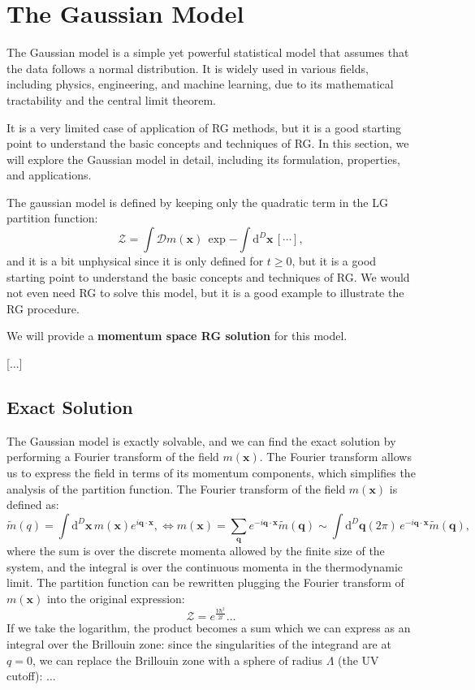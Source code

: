 
\section{The Gaussian Model}

The Gaussian model is a simple yet powerful statistical model that assumes that the data follows a normal distribution. It is widely used in various fields, including physics, engineering, and machine learning, due to its mathematical tractability and the central limit theorem.

It is a very limited case of application of RG methods, but it is a good starting point to understand the basic concepts and techniques of RG. In this section, we will explore the Gaussian model in detail, including its formulation, properties, and applications.

The gaussian model is defined by keeping only the quadratic term in the LG partition function:
\[
    \mathcal{Z} = \int \mathcal{D}m(\mathbf{x}) \, \exp {-\int \mathrm{d}^D \mathbf{x} \, \left[ \cdots \right]},
\]
and it is a bit unphysical since it is only defined for \(t \geq 0\), but it is a good starting point to understand the basic concepts and techniques of RG. We would not even need RG to solve this model, but it is a good example to illustrate the RG procedure.

We will provide a \textbf{momentum space RG solution} for this model.

    [...]

\subsection{Exact Solution}

The Gaussian model is exactly solvable, and we can find the exact solution by performing a Fourier transform of the field \(m(\mathbf{x})\). The Fourier transform allows us to express the field in terms of its momentum components, which simplifies the analysis of the partition function. The Fourier transform of the field \(m(\mathbf{x})\) is defined as:
\[
    \tilde{m}(q) = \int \mathrm{d}^D \mathbf{x} \, m(\mathbf{x}) e^{i \mathbf{q} \cdot \mathbf{x}}, \iff m(\mathbf{x}) = \sum_{\mathbf{q}} e^{-i \mathbf{q} \cdot \mathbf{x}} \tilde{m}(\mathbf{q}) \sim \int {\mathrm{d}^D \mathbf{q}}{(2\pi)} \, e^{-i \mathbf{q} \cdot \mathbf{x}} \tilde{m}(\mathbf{q}),
\]
where the sum is over the discrete momenta allowed by the finite size of the system, and the integral is over the continuous momenta in the thermodynamic limit. The partition function can be rewritten plugging the Fourier transform of \(m(\mathbf{x})\) into the original expression:
\[
    \mathcal{Z} = e^{\frac{V\hbar^2}{2t}}\dots
\]
If we take the logarithm, the product becomes a sum which we can express as an integral over the Brillouin zone: since the singularities of the integrand are at \(q=0\), we can replace the Brillouin zone with a sphere of radius \(\Lambda\) (the UV cutoff): ...

